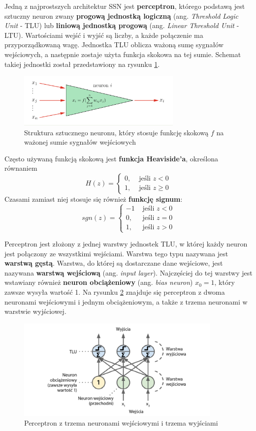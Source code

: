 \documentclass[12pt]{mwbk}
\theoremstyle{plain}
\theoremstyle{definition}
\theoremstyle{remark}
\newcommand\zrodlo[1]{\par\vspace{-3mm}{\small\textit{Źródło: }#1 }}
\begin{document}
Jedną z najprostszych architektur SSN jest \textbf{perceptron}, którego podstawą jest sztuczny neuron zwany \textbf{progową jednostką logiczną} (ang. \textit{Threshold Logic Unit} - TLU) lub \textbf{liniową jednostką progową} (ang. \textit{Linear Threshold Unit} - LTU). Wartościami wejść i wyjść są liczby, a każde połączenie ma przyporządkowaną wagę. Jednostka TLU oblicza ważoną sumę sygnałów wejściowych, a następnie zostaje użyta funkcja skokowa na tej sumie. Schemat takiej jednostki został przedstawiony na rysunku \ref{fig:neurony2}.
\begin{figure}[!h]
	\centering
	\includegraphics[width=8cm]{rys/neurony2.png}
	\caption{Struktura sztucznego neuronu, który stosuje funkcję skokową $f$ na ważonej sumie sygnałów wejściowych}
	\zrodlo{\cite{ertel}}
	\label{fig:neurony2}
\end{figure}
Często używaną funkcją skokową jest \textbf{funkcja Heaviside'a}, określona równaniem 
$$H(z)=\begin{cases}
0, & \text{ jeśli } z<0\\
1, & \text{ jeśli } z \geq 0
\end{cases}$$
Czasami zamiast niej stosuje się również \textbf{funkcję signum}:
$$sgn(z)=\begin{cases}
-1 & \text{ jeśli } z<0\\
0, & \text{ jeśli } z=0\\
1, & \text{ jeśli } z > 0
\end{cases}$$

Perceptron jest złożony z jednej warstwy jednostek TLU, w której każdy neuron jest połączony ze wszystkimi wejściami. Warstwa tego typu nazywana jest \textbf{warstwą gęstą}. Warstwa, do której są dostarczane dane wejściowe, jest nazywana \textbf{warstwą wejściową} (ang. \textit{input layer}). Najczęściej do tej warstwy jest wstawiany również \textbf{neuron obciążeniowy} (ang. \textit{bias neuron}) $x_0=1$, który zawsze wysyła wartość 1. Na rysunku \ref{fig:perceptron1} znajduje się perceptron z dwoma neuronami wejściowymi i jednym obciążeniowym, a także z trzema neuronami w warstwie wyjściowej.

\begin{figure}[!h]
	\centering
	\includegraphics[width=10cm]{rys/perceptron1.png}
	\caption{Perceptron z trzema neuronami wejściowymi i trzema wyjściami}
	\zrodlo{\cite{geron}}
	\label{fig:perceptron1}
\end{figure}
\end{document}
